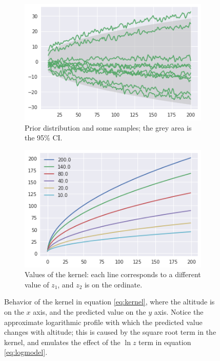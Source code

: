 \documentclass[a4paper,11pt]{kth-mag}
\begin{document}
\begin{figure}
    \centering
    \begin{subfigure}[t]{0.45\textwidth}
        \centering
        \includegraphics[width=\textwidth]{images/profile_kernel_prior}
        \caption{Prior distribution and some samples; the grey area is the 95\% CI.}
        \label{fig:kernel_prior}
    \end{subfigure}
    \hfill
    \begin{subfigure}[t]{0.45\textwidth}
        \centering
        \includegraphics[width=\textwidth]{images/kernel_values}
        \caption{Values of the kernel: each line corresponds to a different value of $z_1$, and $z_2$ is on the ordinate.}
        \label{fig:kernel_values}
    \end{subfigure}
    \caption{Behavior of the kernel in equation \ref{eq:kernel}, where the altitude is on the $x$ axis, and the predicted value on the $y$ axis. Notice the approximate logarithmic profile with which the predicted value changes with altitude; this is caused by the square root term in the kernel, and emulates the effect of the $\ln z$ term in equation \ref{eq:logmodel}.}
	\label{fig:kernel}
\end{figure}
\end{document}
